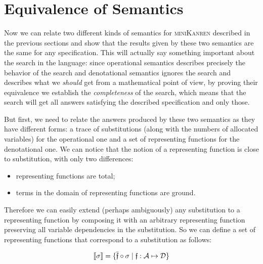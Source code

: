 \section{Equivalence of Semantics}
\label{equivalence}

Now we can relate two different kinds of semantics for \textsc{miniKanren} described in the previous sections and show that the results given by these two semantics are the same for any specification.
This will actually say something important about the search in the language: since operational semantics describes precisely the behavior of the search and denotational semantics
ignores the search and describes what we \emph{should} get from a mathematical point of view, by proving their equivalence we establish the \emph{completeness} of the search, which
means that the search will get all answers satisfying the described specification and only those.

But first, we need to relate the answers produced by these two semantics as they have different forms: a trace of substitutions (along with the numbers of allocated variables)
for the operational one and a set of representing functions for the denotational one. We can notice that the notion of a representing function is close to substitution, with only two differences:

\begin{itemize}
\item representing functions are total;
\item terms in the domain of representing functions are ground.
\end{itemize}

Therefore we can easily extend (perhaps ambiguously) any substitution to a representing function by composing it with an arbitrary representing function preserving
all variable dependencies in the substitution. So we can define a set of representing functions that correspond to a substitution as follows:

\[
\llbracket{\sigma}\rrbracket = \{\overline{\mathfrak f} \circ \sigma \mid \mathfrak{f}:\mathcal{A}\mapsto\mathcal{D}\}
\]

\begin{comment}
In \textsc{Coq} this notion boils down to the following definition:

\begin{lstlisting}[language=Coq]
   Definition in_denotational_sem_subst
     (s : subst) (f : repr_fun) : Prop :=
       exists (f' : repr_fun),
         repr_fun_eq (subst_repr_fun_compose s f') f.
\end{lstlisting}

where ``\lstinline[language=Coq]|repr_fun_eq|'' stands for representing functions extensional equality, ``\lstinline[language=Coq]|subst_repr_fun_compose|''~---
for a composition of a substitution and a representing function.
\end{comment}

